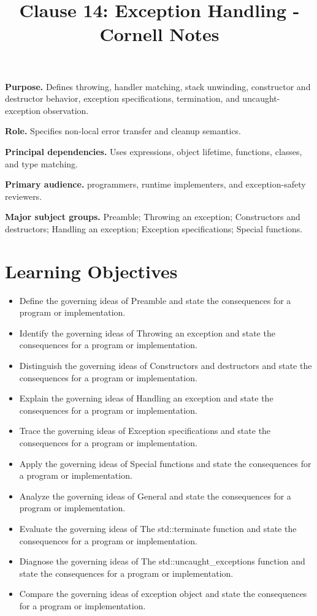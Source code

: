 \documentclass[11pt,letterpaper]{article}
\title{Clause 14: Exception Handling - Cornell Notes}
\author{}
\date{}
\begin{document}
\maketitle
\begin{CornellReferenceOrientationBox}
\textbf{Purpose.} Defines throwing, handler matching, stack unwinding, constructor and destructor behavior, exception specifications, termination, and uncaught-exception observation.
\par\textbf{Role.} Specifies non-local error transfer and cleanup semantics.
\par\textbf{Principal dependencies.} Uses expressions, object lifetime, functions, classes, and type matching.
\par\textbf{Primary audience.} programmers, runtime implementers, and exception-safety reviewers.
\par\textbf{Major subject groups.} Preamble; Throwing an exception; Constructors and destructors; Handling an exception; Exception specifications; Special functions.
\end{CornellReferenceOrientationBox}
\section{Learning Objectives}
\begin{itemize}[label=\textcolor{CornellReferenceTeal}{$\blacktriangleright$}]
\item Define the governing ideas of Preamble and state the consequences for a program or implementation.
\item Identify the governing ideas of Throwing an exception and state the consequences for a program or implementation.
\item Distinguish the governing ideas of Constructors and destructors and state the consequences for a program or implementation.
\item Explain the governing ideas of Handling an exception and state the consequences for a program or implementation.
\item Trace the governing ideas of Exception specifications and state the consequences for a program or implementation.
\item Apply the governing ideas of Special functions and state the consequences for a program or implementation.
\item Analyze the governing ideas of General and state the consequences for a program or implementation.
\item Evaluate the governing ideas of The std::terminate function and state the consequences for a program or implementation.
\item Diagnose the governing ideas of The std::uncaught\_\allowbreak{}exceptions function and state the consequences for a program or implementation.
\item Compare the governing ideas of exception object and state the consequences for a program or implementation.
\end{itemize}
\end{document}

